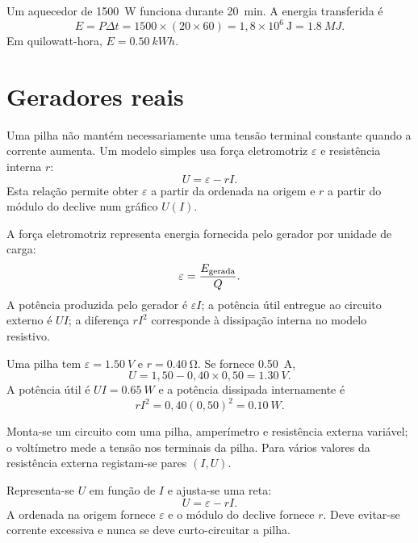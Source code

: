 \documentclass[11pt,a4paper,oneside]{book}
\begin{document}
\begin{exemplo}
Um aquecedor de \SI{1500}{W} funciona durante \SI{20}{min}. A energia transferida é
\[
E=P\Delta t=1500\times(20\times60)=1{,}8\times10^6\ \mathrm{J}=\SI{1.8}{MJ}.
\]
Em quilowatt-hora, $E=\SI{0.50}{kWh}$.
\end{exemplo}

\section{Geradores reais}
Uma pilha não mantém necessariamente uma tensão terminal constante quando a corrente aumenta. Um modelo simples usa força eletromotriz $\varepsilon$ e resistência interna $r$:
\[
U=\varepsilon-rI.
\]
Esta relação permite obter $\varepsilon$ a partir da ordenada na origem e $r$ a partir do módulo do declive num gráfico $U(I)$.

\begin{center}
\end{center}

A força eletromotriz representa energia fornecida pelo gerador por unidade de carga:
\[
\varepsilon=\frac{E_{\rm gerada}}{Q}.
\]
A potência produzida pelo gerador é $\varepsilon I$; a potência útil entregue ao circuito externo é $UI$; a diferença $rI^2$ corresponde à dissipação interna no modelo resistivo.

\begin{exemplo}[title=Exemplo resolvido -- gerador real]
Uma pilha tem $\varepsilon=\SI{1.50}{V}$ e $r=\SI{0.40}{\ohm}$. Se fornece \SI{0.50}{A},
\[
U=1{,}50-0{,}40\times0{,}50=\SI{1.30}{V}.
\]
A potência útil é $UI=\SI{0.65}{W}$ e a potência dissipada internamente é
\[
rI^2=0{,}40(0{,}50)^2=\SI{0.10}{W}.
\]
\end{exemplo}

\begin{atividade}[title=AL 2.1 -- Características de uma pilha]
Monta-se um circuito com uma pilha, amperímetro e resistência externa variável; o voltímetro mede a tensão nos terminais da pilha. Para vários valores da resistência externa registam-se pares $(I,U)$.

Representa-se $U$ em função de $I$ e ajusta-se uma reta:
\[
U=\varepsilon-rI.
\]
A ordenada na origem fornece $\varepsilon$ e o módulo do declive fornece $r$. Deve evitar-se corrente excessiva e nunca se deve curto-circuitar a pilha.
\end{atividade}
\end{document}
